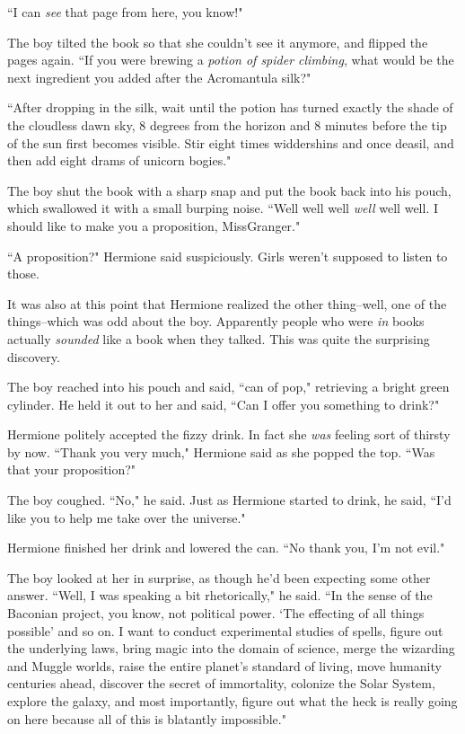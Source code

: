 ``I can \emph{see} that page from here, you know!"

The boy tilted the book so that she couldn't see it anymore, and flipped the pages again. ``If you were brewing a \emph{potion of spider climbing}, what would be the next ingredient you added after the Acromantula silk?"

``After dropping in the silk, wait until the potion has turned exactly the shade of the cloudless dawn sky, 8 degrees from the horizon and 8 minutes before the tip of the sun first becomes visible. Stir eight times widdershins and once deasil, and then add eight drams of unicorn bogies."

The boy shut the book with a sharp snap and put the book back into his pouch, which swallowed it with a small burping noise. ``Well well well \emph{well} well well. I should like to make you a proposition, Miss\?Granger."

``A proposition?" Hermione said suspiciously. Girls weren't supposed to listen to those.

It was also at this point that Hermione realized the other thing\---well, one of the things\---which was odd about the boy. Apparently people who were \emph{in} books actually \emph{sounded} like a book when they talked. This was quite the surprising discovery.

The boy reached into his pouch and said, ``can of pop," retrieving a bright green cylinder. He held it out to her and said, ``Can I offer you something to drink?"

Hermione politely accepted the fizzy drink. In fact she \emph{was} feeling sort of thirsty by now. ``Thank you very much," Hermione said as she popped the top. ``Was that your proposition?"

The boy coughed. ``No," he said. Just as Hermione started to drink, he said, ``I'd like you to help me take over the universe."

Hermione finished her drink and lowered the can. ``No thank you, I'm not evil."

The boy looked at her in surprise, as though he'd been expecting some other answer. ``Well, I was speaking a bit rhetorically," he said. ``In the sense of the Baconian project, you know, not political power. `The effecting of all things possible' and so on. I want to conduct experimental studies of spells, figure out the underlying laws, bring magic into the domain of science, merge the wizarding and Muggle worlds, raise the entire planet's standard of living, move humanity centuries ahead, discover the secret of immortality, colonize the Solar System, explore the galaxy, and most importantly, figure out what the heck is really going on here because all of this is blatantly impossible."

